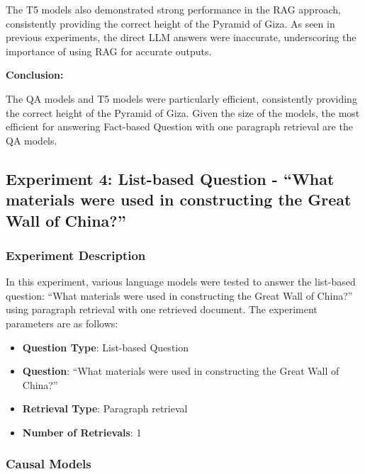 \documentclass{wseas}
\begin{document}
The T5 models also demonstrated strong performance in the RAG approach,
consistently providing the correct height of the Pyramid of Giza. As
seen in previous experiments, the direct LLM answers were inaccurate,
underscoring the importance of using RAG for accurate outputs.

\textbf{Conclusion:}

The QA models and T5 models were particularly efficient, consistently
providing the correct height of the Pyramid of Giza. Given the size of
the models, the most efficient for answering Fact-based Question with
one paragraph retrieval are the QA models.

\subsection{Experiment 4: List-based Question - ``What materials were
used in constructing the Great Wall of
China?''}

\subsubsection{Experiment Description}

In this experiment, various language models were tested to answer the
list-based question: ``What materials were used in constructing the
Great Wall of China?'' using paragraph retrieval with one retrieved
document. The experiment parameters are as follows:

\begin{itemize}

\item
  \textbf{Question Type}: List-based Question
\item
  \textbf{Question}: ``What materials were used in constructing the
  Great Wall of China?''
\item
  \textbf{Retrieval Type}: Paragraph retrieval
\item
  \textbf{Number of Retrievals}: 1
\end{itemize}

\subsubsection{Causal Models}
\end{document}
